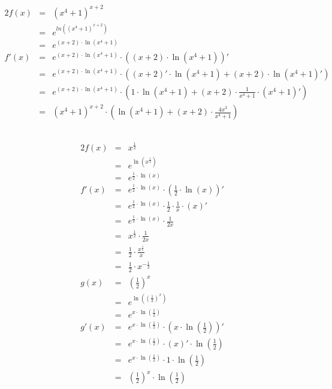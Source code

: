 \documentclass[10pt,a4paper,oneside,ngerman,numbers=noenddot]{scrartcl}
\begin{document}
\section{} %
\subsection{} %
\begin{alignat*}{2}
f(x) &=& (x^{4}+1)^{x+2} \\
&=& e^{ln\left((x^{4}+1)^{x+2}\right)} \\
&=& e^{(x+2) \cdot \ln(x^{4}+1)} \\
f'(x) &=& e^{(x+2) \cdot \ln(x^{4}+1)} \cdot \left((x+2) \cdot \ln(x^{4}+1)\right)' \\
&=& e^{(x+2) \cdot \ln(x^{4}+1)} \cdot \left((x+2)' \cdot \ln(x^{4}+1) + (x+2) \cdot \ln(x^{4}+1)'\right) \\
&=& e^{(x+2) \cdot \ln(x^{4}+1)} \cdot \left(1 \cdot \ln(x^{4}+1) + (x+2) \cdot \frac{1}{x^{4}+1} \cdot (x^{4}+1)'\right) \\
&=& (x^{4}+1)^{x+2} \cdot \left(\ln(x^{4}+1) + (x+2) \cdot \frac{4x^{3}}{x^{4}+1}\right)
\end{alignat*}
\subsection{} %
\begin{alignat*}{2}
f(x) &=& x^{\frac{1}{2}} \\
&=& e^{\ln \left(x^{\frac{1}{2}} \right)} \\
&=& e^{\frac{1}{2} \cdot \ln (x)} \\
f'(x) &=& e^{\frac{1}{2} \cdot \ln (x)} \cdot \left(\frac{1}{2} \cdot \ln (x) \right)' \\
&=& e^{\frac{1}{2} \cdot \ln (x)} \cdot \frac{1}{2} \cdot \frac{1}{x} \cdot (x)' \\
&=& e^{\frac{1}{2} \cdot \ln (x)} \cdot \frac{1}{2x} \\
&=& x^{\frac{1}{2}} \cdot \frac{1}{2x} \\
&=& \frac{1}{2} \cdot \frac{x^{\frac{1}{2}}}{x} \\
&=& \frac{1}{2} \cdot x^{-\frac{1}{2}} \\
g(x) &=& \left( \frac{1}{2}\right)^{x} \\
&=& e^{\ln \left( \left( \frac{1}{2}\right)^{x} \right)} \\
&=& e^{x \cdot \ln \left( \frac{1}{2}\right)} \\
g'(x) &=& e^{x \cdot \ln \left( \frac{1}{2}\right)} \cdot \left(x \cdot \ln \left( \frac{1}{2}\right) \right)' \\
&=& e^{x \cdot \ln \left( \frac{1}{2}\right)} \cdot (x)' \cdot \ln \left( \frac{1}{2}\right) \\
&=& e^{x \cdot \ln \left( \frac{1}{2}\right)} \cdot 1 \cdot \ln \left( \frac{1}{2}\right) \\
&=& \left( \frac{1}{2}\right)^{x} \cdot \ln \left( \frac{1}{2}\right)
\end{alignat*}
\end{document}

